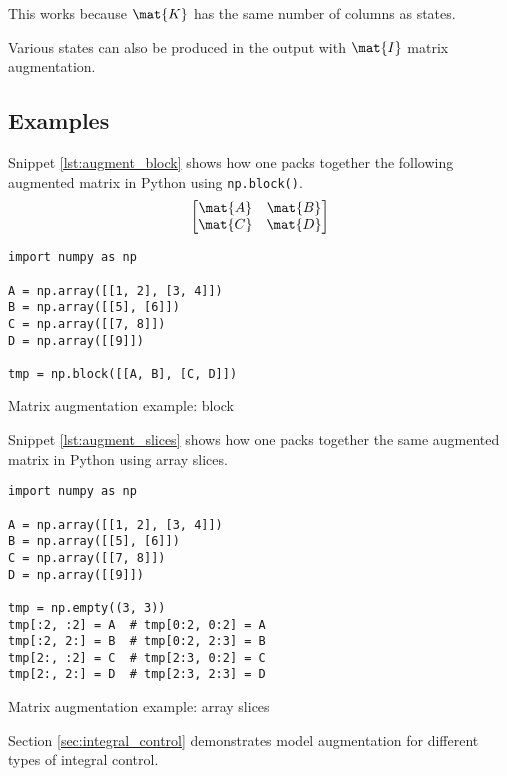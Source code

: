 This works because $\mat{K}$ has the same number of columns as \glspl{state}.

Various \glspl{state} can also be produced in the \gls{output} with $\mat{I}$
matrix augmentation.

\subsection{Examples}

Snippet \ref{lst:augment_block} shows how one packs together the following
augmented matrix in Python using \texttt{np.block()}.
\begin{equation*}
  \begin{bmatrix}
    \mat{A} & \mat{B} \\
    \mat{C} & \mat{D}
  \end{bmatrix}
\end{equation*}
\begin{code}
  \begin{lstlisting}[style=customPython]
import numpy as np

A = np.array([[1, 2], [3, 4]])
B = np.array([[5], [6]])
C = np.array([[7, 8]])
D = np.array([[9]])

tmp = np.block([[A, B], [C, D]])
  \end{lstlisting}
  \caption{Matrix augmentation example: block}
  \label{lst:augment_block}
\end{code}

Snippet \ref{lst:augment_slices} shows how one packs together the same augmented
matrix in Python using array slices.
\begin{code}
  \begin{lstlisting}[style=customPython]
import numpy as np

A = np.array([[1, 2], [3, 4]])
B = np.array([[5], [6]])
C = np.array([[7, 8]])
D = np.array([[9]])

tmp = np.empty((3, 3))
tmp[:2, :2] = A  # tmp[0:2, 0:2] = A
tmp[:2, 2:] = B  # tmp[0:2, 2:3] = B
tmp[2:, :2] = C  # tmp[2:3, 0:2] = C
tmp[2:, 2:] = D  # tmp[2:3, 2:3] = D
  \end{lstlisting}
  \caption{Matrix augmentation example: array slices}
  \label{lst:augment_slices}
\end{code}

Section \ref{sec:integral_control} demonstrates \gls{model} augmentation for
different types of integral control.
